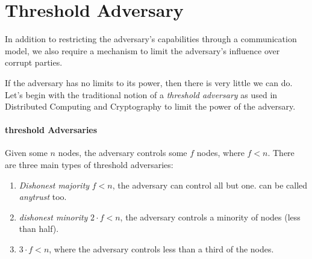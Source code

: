 





\section{Threshold Adversary}
In addition to restricting the adversary's capabilities through a communication model,
 we also require a mechanism to limit the adversary's influence over corrupt parties.

If the adversary has no limits to its power, then there is very little we can do.
Let's begin with the traditional notion of a \emph{threshold adversary} as used in Distributed 
Computing and Cryptography to limit the power of the adversary.


\paragraph{threshold Adversaries}
    Given some $n$ nodes, the adversary controls some $f$ nodes, where $f<n$.
    There are three main types of threshold adversaries:
\begin{enumerate}
    \item \emph{Dishonest majority} $f<n$, the adversary can control all but one. can be called \emph{anytrust} too.
    \item \emph{dishonest minority} $2\cdot f<n$, the adversary controls a minority of nodes (less than half).
    \item $3\cdot f < n$, where the adversary controls less than a third of the nodes.
\end{enumerate}

